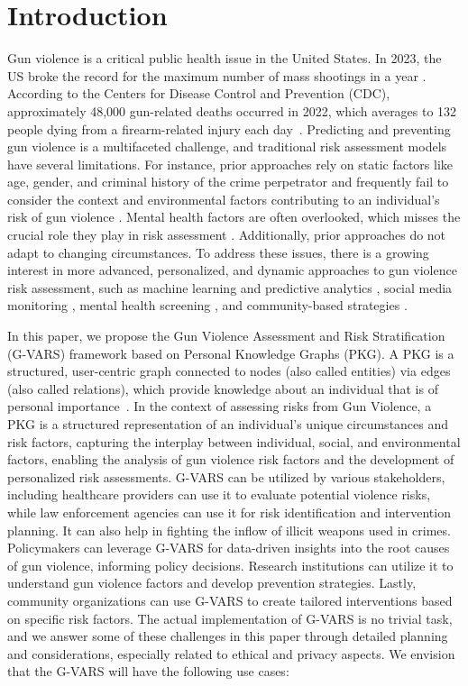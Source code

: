 \documentclass[11pt]{article}
\begin{document}
\section{Introduction}
Gun violence is a critical public health issue in the United States. In 2023, the US broke the record for the maximum number of mass shootings in a year \cite{michael_2023}. According to the Centers for Disease Control and Prevention (CDC), approximately 48,000 gun-related deaths occurred in 2022, which averages to 132 people dying from a firearm-related injury each day~\cite{CDC}. Predicting and preventing gun violence is a multifaceted challenge, and traditional risk assessment models have several limitations. For instance, prior approaches rely on static factors like age, gender, and criminal history of the crime perpetrator \cite{smith2020limitations} and frequently fail to consider the context and environmental factors contributing to an individual's risk of gun violence \cite{jones2019contextual}. Mental health factors are often overlooked, which misses the crucial role they play in risk assessment \cite{doe2021mental}. Additionally, prior approaches do not adapt to changing circumstances. To address these issues, there is a growing interest in more advanced, personalized, and dynamic approaches to gun violence risk assessment, such as machine learning and predictive analytics \cite{chen2020machine}, social media monitoring \cite{adams2019social}, mental health screening \cite{lee2020screening}, and community-based strategies \cite{harris2022community}.
\par
In this paper, we propose the Gun Violence Assessment and Risk Stratification (G-VARS) framework based on Personal Knowledge Graphs (PKG). A PKG is a structured, user-centric graph connected to nodes (also called entities) via edges (also called relations), which provide knowledge about an individual that is of personal importance~\cite{balog2019personal}. In the context of assessing risks from Gun Violence, a PKG is a structured representation of an individual's unique circumstances and risk factors, capturing the interplay between individual, social, and environmental factors, enabling the analysis of gun violence risk factors and the development of personalized risk assessments. \textsf{G-VARS} can be utilized by various stakeholders, including healthcare providers can use it to evaluate potential violence risks, while law enforcement agencies can use it for risk identification and intervention planning. It can also help in fighting the inflow of illicit weapons used in crimes. Policymakers can leverage \textsf{G-VARS} for data-driven insights into the root causes of gun violence, informing policy decisions. Research institutions can utilize it to understand gun violence factors and develop prevention strategies. Lastly, community organizations can use \textsf{G-VARS} to create tailored interventions based on specific risk factors. The actual implementation of \textsf{G-VARS} is no trivial task, and we answer some of these challenges in this paper through detailed planning and considerations, especially related to ethical and privacy aspects. We envision that the \textsf{G-VARS} will have the following use cases:
\end{document}
